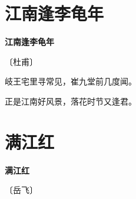 \documentclass[12pt,UTF-8,openany,fontset=none]{ctexbook}
\begin{document}
\vspace{8pt}
\clearpage

\section{江南逢李龟年}


\begin{center}
    {\bfseries 江南逢李龟年}

    \vspace{18pt}

    \begin{large}\xuwen
        〔杜甫〕
    \end{large}

\end{center}

    \vspace{18pt}

\begin{center}
    \begin{Large}

        岐王宅里寻常见，崔九堂前几度闻。

        正是江南好风景，落花时节又逢君。

    \end{Large}

\end{center}

\vspace{8pt}
\clearpage

\section{满江红}


\begin{center}
    {\bfseries 满江红}

    \vspace{18pt}

    \begin{large}\xuwen
        〔岳飞〕
    \end{large}

\end{center}

    \vspace{18pt}  %
\end{document}
